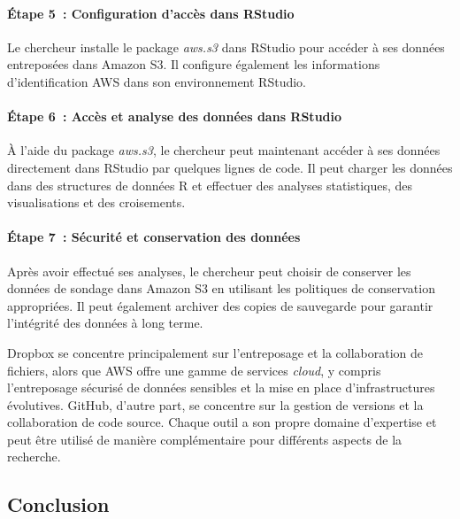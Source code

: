 \documentclass[
  letterpaper,
  DIV=11,
  numbers=noendperiod]{scrreprt}
\let\oldparagraph\paragraph
\renewcommand{\paragraph}[1]{\oldparagraph{#1}\mbox{}}
\begin{document}
\paragraph{Étape 5~: Configuration d'accès dans
RStudio}\label{uxe9tape-5-configuration-daccuxe8s-dans-rstudio}

Le chercheur installe le package \emph{aws.s3} dans RStudio pour accéder
à ses données entreposées dans Amazon S3. Il configure également les
informations d'identification AWS dans son environnement RStudio.

\paragraph{Étape 6~: Accès et analyse des données dans
RStudio}\label{uxe9tape-6-accuxe8s-et-analyse-des-donnuxe9es-dans-rstudio}

À l'aide du package \emph{aws.s3}, le chercheur peut maintenant accéder
à ses données directement dans RStudio par quelques lignes de code. Il
peut charger les données dans des structures de données R et effectuer
des analyses statistiques, des visualisations et des croisements.

\paragraph{Étape 7~: Sécurité et conservation des
données}\label{uxe9tape-7-suxe9curituxe9-et-conservation-des-donnuxe9es}

Après avoir effectué ses analyses, le chercheur peut choisir de
conserver les données de sondage dans Amazon S3 en utilisant les
politiques de conservation appropriées. Il peut également archiver des
copies de sauvegarde pour garantir l'intégrité des données à long terme.

Dropbox se concentre principalement sur l'entreposage et la
collaboration de fichiers, alors que AWS offre une gamme de services
\emph{cloud}, y compris l'entreposage sécurisé de données sensibles et
la mise en place d'infrastructures évolutives. GitHub, d'autre part, se
concentre sur la gestion de versions et la collaboration de code source.
Chaque outil a son propre domaine d'expertise et peut être utilisé de
manière complémentaire pour différents aspects de la recherche.

\subsection{Conclusion}\label{conclusion-3}
\end{document}
